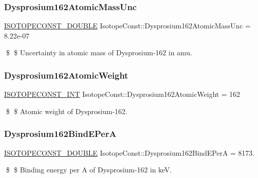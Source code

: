 \subsubsection{\texorpdfstring{Dysprosium162\+Atomic\+Mass\+Unc}{Dysprosium162AtomicMassUnc}}
{\footnotesize\ttfamily \mbox{\hyperlink{group___isotope_const-_macros_ga8f45a7272ce02c0b4c65c44636ed719a}{I\+S\+O\+T\+O\+P\+E\+C\+O\+N\+S\+T\+\_\+\+D\+O\+U\+B\+LE}} Isotope\+Const\+::\+Dysprosium162\+Atomic\+Mass\+Unc = 8.\+22e-\/07}

\$ \$ Uncertainty in atomic mass of Dysprosium-\/162 in amu. \mbox{\label{group___isotope_const-_dysprosium-_dy162_gabbe185bc43119447f3986660de18ba2e}} 
\subsubsection{\texorpdfstring{Dysprosium162\+Atomic\+Weight}{Dysprosium162AtomicWeight}}
{\footnotesize\ttfamily \mbox{\hyperlink{group___isotope_const-_macros_ga5f18360b3e99483a35c32d789e62621c}{I\+S\+O\+T\+O\+P\+E\+C\+O\+N\+S\+T\+\_\+\+I\+NT}} Isotope\+Const\+::\+Dysprosium162\+Atomic\+Weight = 162}

\$ \$ Atomic weight of Dysprosium-\/162. \mbox{\label{group___isotope_const-_dysprosium-_dy162_ga5bbd590d819690abfd1289d73d3d5808}} 
\subsubsection{\texorpdfstring{Dysprosium162\+Bind\+E\+PerA}{Dysprosium162BindEPerA}}
{\footnotesize\ttfamily \mbox{\hyperlink{group___isotope_const-_macros_ga8f45a7272ce02c0b4c65c44636ed719a}{I\+S\+O\+T\+O\+P\+E\+C\+O\+N\+S\+T\+\_\+\+D\+O\+U\+B\+LE}} Isotope\+Const\+::\+Dysprosium162\+Bind\+E\+PerA = 8173.}

\$ \$ Binding energy per A of Dysprosium-\/162 in keV. \mbox{\label{group___isotope_const-_dysprosium-_dy162_gaea4fe50130e3e9b8ce70263f6f1ac41e}} 
